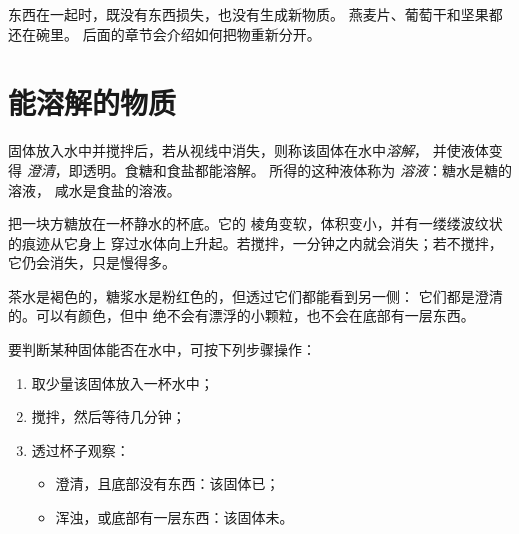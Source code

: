\begin{remark}[混合不会使物质消失]\label{rem:g2:mixing-and-dissolving:nothing-lost}
东西在一起时，既没有东西损失，也没有生成新物质。
燕麦片、葡萄干和坚果都还在碗里。
后面的章节会介绍如何把物重新分开。
\end{remark}

\section{能溶解的物质}

\begin{definition}[溶解与溶液]\label{def:g2:mixing-and-dissolving:dissolve}
固体放入水中并搅拌后，若从视线中消失，则称该固体在水中\emph{溶解}，
并使液体变得
\emph{澄清}，即透明。食糖和食盐都能溶解。
所得的这种液体称为
\emph{溶液}：糖水是糖的溶液，
咸水是食盐的溶液。
\end{definition}

\begin{example}[一杯水中的方糖]\label{ex:g2:mixing-and-dissolving:cube}
把一块方糖放在一杯静水的杯底。它的
棱角变软，体积变小，并有一缕缕波纹状的痕迹从它身上
穿过水体向上升起。若搅拌，一分钟之内就会消失；若不搅拌，
它仍会消失，只是慢得多。
\end{example}

\begin{remark}[澄清不等于无色]\label{rem:g2:mixing-and-dissolving:clear}
茶水是褐色的，糖浆水是粉红色的，但透过它们都能看到另一侧：
它们都是澄清的。可以有颜色，但中
绝不会有漂浮的小颗粒，也不会在底部有一层东西。
\end{remark}

\begin{method}[它能溶解吗？]\label{met:g2:mixing-and-dissolving:test}
要判断某种固体能否在水中，可按下列步骤操作：
\begin{enumerate}
  \item 取少量该固体放入一杯水中；
  \item 搅拌，然后等待几分钟；
  \item 透过杯子观察：
    \begin{itemize}
      \item 澄清，且底部没有东西：该固体已；
      \item 浑浊，或底部有一层东西：该固体未。
    \end{itemize}
\end{enumerate}
\end{method}

